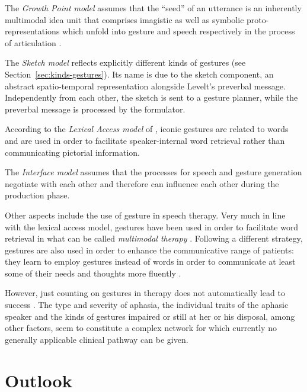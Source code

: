 \documentclass[output=paper
 	        ,biblatex
                ,babelshorthands
                ,newtxmath
                ,draftmode
                ,colorlinks, citecolor=brown
]{langscibook}
\begin{document}
The \emph{Growth Point model} \citep{McNeill:Duncan:2000} assumes that the \enquote{seed} of an utterance is an inherently multimodal idea unit that comprises imagistic as well as symbolic proto-representations which unfold into gesture and speech respectively in the process of articulation \citetext{see also \citealt{Roepke:2011} on the growth point's entrenchment in contexts and frames}.

The \emph{Sketch model} \citep{de:Ruiter:2000} reflects explicitly different kinds of gestures (see Section~\ref{sec:kinds-gestures}). 
%
Its name is due to the sketch component, an abstract spatio-temporal representation alongside Levelt's preverbal message. 
%
Independently from each other, the sketch is sent to a gesture planner, while the preverbal message is processed by the formulator.

According to the \emph{Lexical Access model} of \citet{Krauss:Chen:Gottesmann:2000}, iconic gestures are related to words and are used in order to facilitate speaker-internal word retrieval rather than communicating pictorial information.

The \emph{Interface model} \citep{Kita:Ozyurek:2003} assumes that the processes for speech and gesture generation negotiate with each other and therefore can influence each other during the production phase.

Other aspects include the use of gesture in speech therapy. 
%
Very much in line with the lexical access model, gestures have been used in order to facilitate word retrieval in what can be called \emph{multimodal therapy} \citep{Rose:2006}.
%
Following a different strategy, gestures are also used in order to enhance the communicative range of patients: they learn to employ gestures instead of words in order to communicate at least some of their needs and thoughts more fluently \citep{Cubelli:Trentini:Montagna:1991,Caute:et:al:2013}.

However, just counting on gestures in therapy does not automatically lead to success \citep{Auer:Bauer:2011}. 
%
The type and severity of aphasia, the individual traits of the aphasic speaker and the kinds of gestures impaired or still at her or his disposal, among other factors, seem to constitute a complex network for which currently no generally applicable clinical pathway can be given.




\section{Outlook}
\label{sec:outlook}
\end{document}
